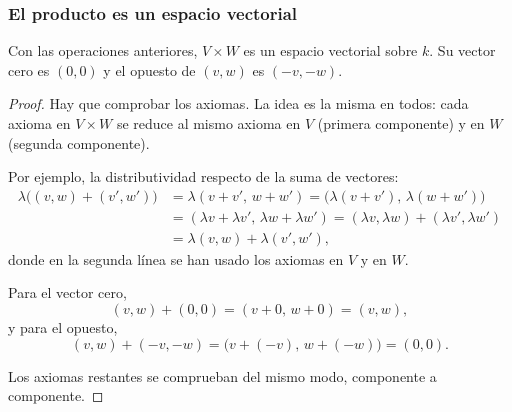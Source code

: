 \begin{frame}[allowframebreaks]
    \frametitle{El producto es un espacio vectorial}

    \begin{proposition}
        Con las operaciones anteriores, $V\times W$ es un espacio vectorial
        sobre $k$. Su vector cero es $(0,0)$ y el opuesto de $(v,w)$ es
        $(-v,-w)$.
    \end{proposition}

    \begin{proof}
        Hay que comprobar los axiomas. La idea es la misma en todos:
        cada axioma en $V\times W$ se reduce al mismo axioma en $V$
        (primera componente) y en $W$ (segunda componente).

        Por ejemplo, la distributividad respecto de la suma de vectores:
        \begin{align*}
            \lambda\bigl((v,w)+(v',w')\bigr)
            &=\lambda(v+v',\,w+w')
            =\bigl(\lambda(v+v'),\,\lambda(w+w')\bigr)\\
            &=(\lambda v+\lambda v',\,\lambda w+\lambda w')
            =(\lambda v,\lambda w)+(\lambda v',\lambda w')\\
            &=\lambda(v,w)+\lambda(v',w'),
        \end{align*}
        donde en la segunda línea se han usado los axiomas en $V$ y en $W$.

        Para el vector cero,
        \[
            (v,w)+(0,0)=(v+0,\,w+0)=(v,w),
        \]
        y para el opuesto,
        \[
            (v,w)+(-v,-w)=\bigl(v+(-v),\,w+(-w)\bigr)=(0,0).
        \]

        Los axiomas restantes se comprueban del mismo modo, componente
        a componente.
    \end{proof}
\end{frame}


